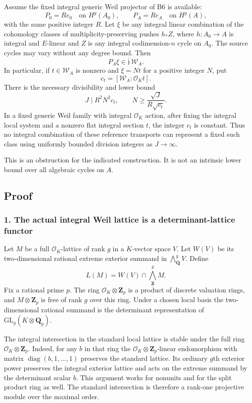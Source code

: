 \documentclass[11pt,a4paper]{article}
\theoremstyle{definition}
\begin{document}
Assume the fixed integral generic Weil projector of B6 is available: \[
 P_0=Re_0\quad\text{on }H^g(A_0),\qquad
 P_A=Re_A\quad\text{on }H^g(A),
\] with the same positive integer \(R\). Let \(\xi\) be any integral linear combination of the cohomology classes of multiplicity-preserving pushes \(h_*Z\), where \(h:A_0\to A\) is integral and \(E\)-linear and \(Z\) is any integral codimension-\(n\) cycle on \(A_0\). The source cycles may vary without any degree bound. Then \[
 P_A\xi\in\overline{\mathfrak j}\,\mathscr W_A.
\tag{B23.6}
\] In particular, if \(t\in\mathscr W_A\) is nonzero and \(\xi=Nt\) for a positive integer \(N\), put \[
 c_t=[\mathscr W_A:\mathcal O_Kt].
\] There is the necessary divisibility and lower bound \[
 J\mid R^2N^2c_t,
 \qquad
 N\ge\frac{\sqrt J}{R\sqrt{c_t}}.
\tag{B23.7}
\] In a fixed generic Weil family with integral \(\mathcal O_K\) action, after fixing the integral local system and a nonzero flat integral section \(t\), the integer \(c_t\) is constant. Thus no integral combination of these reference transports can represent a fixed such class using uniformly bounded division integers as \(J\to\infty\).

This is an obstruction for the indicated construction. It is not an intrinsic lower bound over all algebraic cycles on \(A\).

\subsection{Proof}\label{transport_ideal_content_proofs-proof}

\subsubsection{1. The actual integral Weil lattice is a determinant-lattice functor}\label{the-actual-integral-weil-lattice-is-a-determinant-lattice-functor}

Let \(M\) be a full \(\mathcal O_K\)-lattice of rank \(g\) in a \(K\)-vector space \(V\). Let \(W(V)\) be its two-dimensional rational extreme exterior summand in \(\bigwedge^g_{\mathbf Q}V\). Define \[
 L(M)=W(V)\cap\bigwedge^g_{\mathbf Z}M.
\] Fix a rational prime \(p\). The ring \(\mathcal O_K\otimes\mathbf Z_p\) is a product of discrete valuation rings, and \(M\otimes\mathbf Z_p\) is free of rank \(g\) over this ring. Under a chosen local basis the two-dimensional rational summand is the determinant representation of \(\mathrm{GL}_g(K\otimes\mathbf Q_p)\).

The integral intersection in the standard local lattice is stable under the full ring \(\mathcal O_K\otimes\mathbf Z_p\). Indeed, for any \(b\) in that ring the \(\mathcal O_K\otimes\mathbf Z_p\)-linear endomorphism with matrix \(\operatorname{diag}(b,1,\ldots,1)\) preserves the standard lattice. Its ordinary \(g\)th exterior power preserves the integral exterior lattice and acts on the extreme summand by the determinant scalar \(b\). This argument works for nonunits and for the split product ring as well. The standard intersection is therefore a rank-one projective module over the maximal order.
\end{document}
